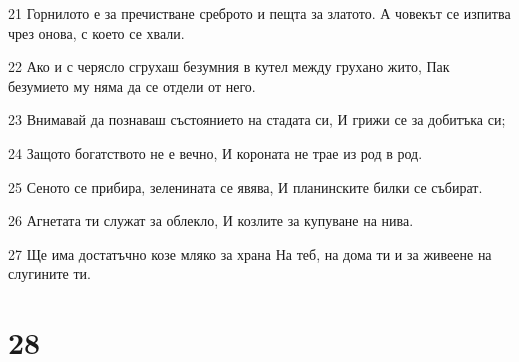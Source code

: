 \par 21 Горнилото е за пречистване среброто и пещта за златото. А човекът се изпитва чрез онова, с което се хвали.
\par 22 Ако и с черясло сгрухаш безумния в кутел между грухано жито, Пак безумието му няма да се отдели от него.
\par 23 Внимавай да познаваш състоянието на стадата си, И грижи се за добитъка си;
\par 24 Защото богатството не е вечно, И короната не трае из род в род.
\par 25 Сеното се прибира, зеленината се явява, И планинските билки се събират.
\par 26 Агнетата ти служат за облекло, И козлите за купуване на нива.
\par 27 Ще има достатъчно козе мляко за храна На теб, на дома ти и за живеене на слугините ти.

\chapter{28}

